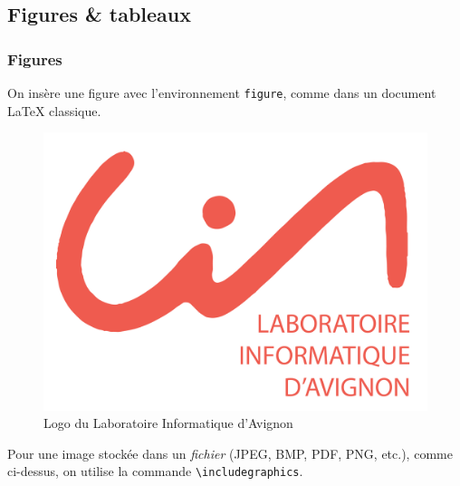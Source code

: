 \documentclass[10pt,    %
    french,             %
    xcolor=table,       %
    envcountsect,       %
    aspectratio=43      %
]{beamer}
\begin{document}
\subsection{Figures \& tableaux}
\begin{frame}
    \frametitle{Figures}
    
    On insère une figure avec l'environnement \texttt{figure}, comme dans un document \LaTeX{} classique.
    
    \begin{figure}[H]
        \centering
        \includegraphics[scale=0.05]{images/lia_logo.pdf}
        \vspace{-0.5cm}
        \caption{Logo du Laboratoire Informatique d'Avignon}
        \label{fig:LIAlogo}
    \end{figure}
    
    \vspace{0.25cm}
    Pour une image stockée dans un \textit{fichier} (JPEG, BMP, PDF, PNG, etc.), comme ci-dessus, on utilise la commande \texttt{\textbackslash{}includegraphics}.
    
    
\end{frame}
\end{document}

